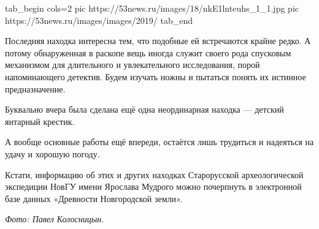 \ifcmt
tab_begin cols=2
pic https://53news.ru/images/18/nkE1lnteuhs_1_1.jpg
pic https://53news.ru/images/images/2019/%
tab_end
\fi

Последняя находка интересна тем, что подобные ей встречаются крайне редко. А
потому обнаруженная в раскопе вещь иногда служит своего рода спусковым
механизмом для длительного и увлекательного исследования, порой напоминающего
детектив. Будем изучать ножны и пытаться понять их истинное предназначение.

Буквально вчера была сделана ещё одна неординарная находка — детский янтарный
крестик.

А вообще основные работы ещё впереди, остаётся лишь трудиться и надеяться на
удачу и хорошую погоду.

Кстати, информацию об этих и других находках Старорусской археологической
экспедиции НовГУ имени Ярослава Мудрого можно почерпнуть в электронной базе
данных «Древности Новгородской земли».

\emph{Фото: Павел Колосницын.}
